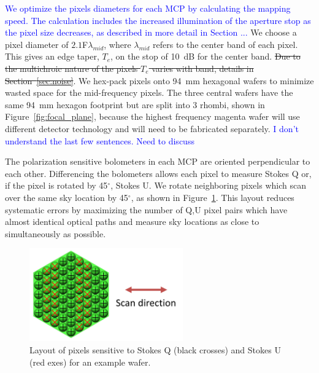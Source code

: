 \documentclass[]{spie}  %
\newcommand{\comr}[1]{\textcolor{red}{#1}}
\newcommand{\comb}[1]{\textcolor{blue}{#1}}
\newcommand{\dgr}{$^\circ$}
\begin{document}
\comb{We optimize the pixels diameters for each MCP by calculating the mapping speed. The calculation includes the 
increased illumination of the aperture stop as the pixel size decreases, as described in more detail in Section ... }
We choose a pixel diameter of $2.1$F$\lambda_{mid}$, where $\lambda_{mid}$ refers to the center 
band of each pixel. This gives an edge taper, $T_e$, on the stop of 10~dB for the center band. 
\sout{Due to the multichroic nature of the pixels $T_e$ varies with band, details in Section~\ref{sec:noise}}. 
We hex-pack pixels onto 94~mm hexagonal wafers to minimize wasted space for the mid-frequency pixels. 
The three central wafers have the same 94~mm hexagon footprint but are split into 
3 rhombi, shown in Figure~\ref{fig:focal_plane}, because the highest frequency magenta wafer will use different 
detector technology and will need to be fabricated separately.  \comb{I don't understand the last few sentences. Need to discuss}

The polarization sensitive bolometers in each MCP are oriented perpendicular to each other. 
Differencing the bolometers allows each pixel to measure Stokes Q or, if the 
pixel is rotated by 45\dgr, Stokes U. We rotate neighboring pixels which scan over the same sky location by 45\dgr, as shown in Figure~\ref{fig:QU}.
This layout reduces systematic errors by maximizing the number of Q,U pixel pairs which have almost identical optical paths and measure sky locations 
as close to simultaneously as possible.  %

\begin{figure} [ht]
\begin{center}
\includegraphics[height=4cm]{QU_wafer.png}
\end{center}
\caption { \label{fig:QU} 
Layout of pixels sensitive to Stokes Q (black crosses) and Stokes U (red exes) for an example wafer.}
\end{figure}
\end{document}

